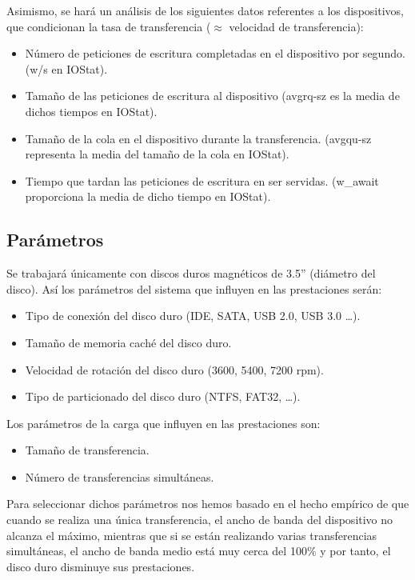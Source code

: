 \documentclass[a4paper,10pt]{article}
\renewcommand{\texttt}[2][black!60]{\textcolor{#1}{\ttfamily #2}}
\begin{document}
 Asimismo, se hará un análisis de los siguientes datos referentes a los dispositivos, que condicionan la tasa de transferencia
 ($\approx$ velocidad de transferencia):
\begin{itemize}
 \item Número de peticiones de escritura completadas en el dispositivo por segundo. (\texttt{w/s} en IOStat).
 \item Tamaño de las peticiones de escritura al dispositivo (\texttt{avgrq-sz} es la media de dichos tiempos en
 IOStat).
 \item Tamaño de la cola en el dispositivo durante la transferencia. (\texttt{avgqu-sz} representa la media del
 tamaño de la cola en IOStat).
 \item Tiempo que tardan las peticiones de escritura en ser servidas. (\texttt{w\_await} proporciona la media
 de dicho tiempo en IOStat).
\end{itemize}

\subsection{Parámetros}
Se trabajará únicamente con discos duros magnéticos de 3.5'' (diámetro del disco).
Así los parámetros del sistema que influyen en las prestaciones serán:
\begin{itemize}
 \item Tipo de conexión del disco duro (IDE, SATA, USB 2.0, USB 3.0 \ldots).
 \item Tamaño de memoria caché del disco duro.
 \item Velocidad de rotación del disco duro (3600, 5400, 7200 rpm).
 \item Tipo de particionado del disco duro (NTFS, FAT32, \ldots).
 
 \cite{hddparam}
\end{itemize}

Los parámetros de la carga que influyen en las prestaciones son:
\begin{itemize}
 \item Tamaño de transferencia.
 \item Número de transferencias simultáneas.
\end{itemize}
Para seleccionar dichos parámetros nos hemos basado en el hecho empírico de que cuando se realiza una única transferencia,
el ancho de banda del dispositivo no alcanza el máximo, mientras que si se están realizando varias transferencias
simultáneas, el ancho de banda medio está muy cerca del 100\% y por tanto, el disco duro disminuye sus prestaciones.
\end{document}
